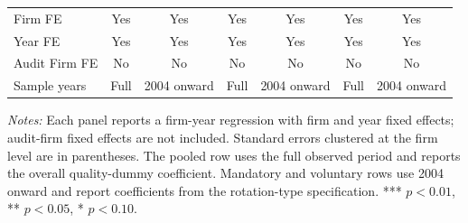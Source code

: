 \begin{table}[htbp]
\begin{threeparttable}
{\begin{tabular}{l cc cc cc}
Firm FE & Yes & Yes & Yes & Yes & Yes & Yes \\
Year FE & Yes & Yes & Yes & Yes & Yes & Yes \\
Audit Firm FE & No & No & No & No & No & No \\
Sample years & Full & 2004 onward & Full & 2004 onward & Full & 2004 onward \\
\bottomrule
\end{tabular}}
\begin{tablenotes}\footnotesize
\item \textit{Notes:} Each panel reports a firm-year regression with firm and year fixed effects; audit-firm fixed effects are not included. Standard errors clustered at the firm level are in parentheses. The pooled row uses the full observed period and reports the overall quality-dummy coefficient. Mandatory and voluntary rows use 2004 onward and report coefficients from the rotation-type specification. *** \(p<0.01\), ** \(p<0.05\), * \(p<0.10\).
\end{tablenotes}
\end{threeparttable}
\end{table}
